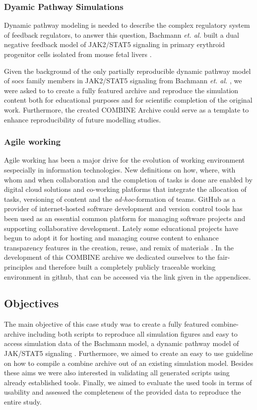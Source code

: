 \subsubsection*{Dyamic Pathway Simulations}
Dynamic pathway modeling is needed to describe the complex regulatory system of feedback regulators, to answer this question, Bachmann \textit{et. al.} built a dual negative feedback model of JAK2/STAT5 signaling in primary erythroid progenitor cells isolated from mouse fetal livers \cite{bachmannmodel}.

Given the background of the only partially reproducible dynamic pathway model of \ac{socs} family members in JAK2/STAT5 signaling from Bachmann \textit{et. al.} \cite{bachmannmodel}, we  were asked to  to create a fully featured archive and reproduce the simulation content both for educational purposes and for scientific completion of the original work. Furthermore, the created COMBINE Archive could serve as a template to enhance reproducibility of future modelling studies.

\subsubsection*{Agile working}
Agile working has been a major drive for the evolution of working environment sespecially in information technologies. New definitions on how, where, with whom and when collaboration and the completion of tasks is done are enabled by digital cloud solutions and co-working platforms that integrate the allocation of tasks, versioning of content and the \textit{ad-hoc}-formation of teams. GitHub as a provider of internet-hosted software development and version control tools has been used as an essential common platform for managing software projects and supporting collaborative development. Lately some educational projects have begun to adopt it for hosting and managing course content to enhance transparency features in the creation, reuse, and remix of materials \cite{github, Knegendorf.}. In the development of this COMBINE archive we dedicated ourselves to the \acs{fair}-principles and therefore built a completely publicly traceable working environment in github, that can be accessed via the link given in the appendices.



\subsection*{Objectives}
The main objective of this case study was to create a fully featured \acs{combine}-archive including both scripts to reproduce all simulation figures and easy to access simulation data of the Bachmann model, a dynamic pathway model of JAK/STAT5 signaling \cite{bachmannmodel}. Furthermore, we aimed to create an easy to use guideline on how to compile a \acs{combine} archive out of an existing simulation model. Besides these aims we were also interested in validating all generated scripts using already established tools. Finally, we aimed to evaluate the used tools in terms of usability and assessed the completeness of the provided data to reproduce the entire study.

